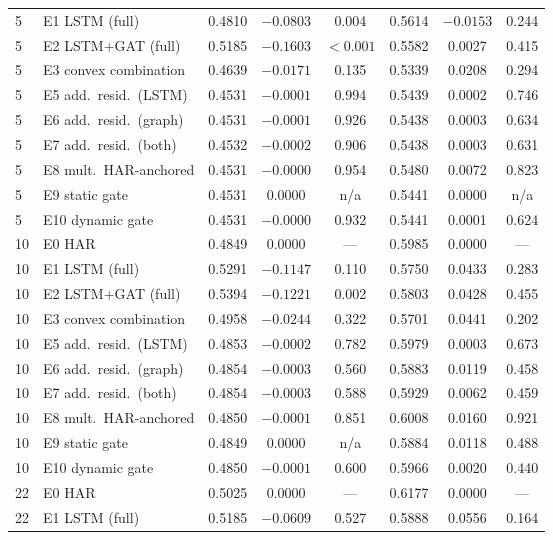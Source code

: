 \documentclass[runningheads]{llncs}
\begin{document}
\begin{table}[t]
\begin{tabular}{ll ccc ccc}
5  & E1 LSTM (full)         & 0.4810 & $-0.0803$ & 0.004 & 0.5614 & $-0.0153$ & 0.244 \\
5  & E2 LSTM+GAT (full)     & 0.5185 & $-0.1603$ & $<0.001$ & 0.5582 & 0.0027  & 0.415 \\
5  & E3 convex combination  & 0.4639 & $-0.0171$ & 0.135 & 0.5339 & 0.0208  & 0.294 \\
5  & E5 add.\ resid.\ (LSTM)   & 0.4531 & $-0.0001$ & 0.994 & 0.5439 & 0.0002  & 0.746 \\
5  & E6 add.\ resid.\ (graph)  & 0.4531 & $-0.0001$ & 0.926 & 0.5438 & 0.0003  & 0.634 \\
5  & E7 add.\ resid.\ (both)   & 0.4532 & $-0.0002$ & 0.906 & 0.5438 & 0.0003  & 0.631 \\
5  & E8 mult.\ HAR-anchored    & 0.4531 & $-0.0000$ & 0.954 & 0.5480 & 0.0072  & 0.823 \\
5  & E9 static gate         & 0.4531 & 0.0000  & n/a & 0.5441 & 0.0000  & n/a \\
5  & E10 dynamic gate       & 0.4531 & $-0.0000$ & 0.932 & 0.5441 & 0.0001  & 0.624 \\
\midrule
10 & E0 HAR                 & 0.4849 & 0.0000  & --- & 0.5985 & 0.0000  & --- \\
10 & E1 LSTM (full)         & 0.5291 & $-0.1147$ & 0.110 & 0.5750 & 0.0433  & 0.283 \\
10 & E2 LSTM+GAT (full)     & 0.5394 & $-0.1221$ & 0.002 & 0.5803 & 0.0428  & 0.455 \\
10 & E3 convex combination  & 0.4958 & $-0.0244$ & 0.322 & 0.5701 & 0.0441  & 0.202 \\
10 & E5 add.\ resid.\ (LSTM)   & 0.4853 & $-0.0002$ & 0.782 & 0.5979 & 0.0003  & 0.673 \\
10 & E6 add.\ resid.\ (graph)  & 0.4854 & $-0.0003$ & 0.560 & 0.5883 & 0.0119  & 0.458 \\
10 & E7 add.\ resid.\ (both)   & 0.4854 & $-0.0003$ & 0.588 & 0.5929 & 0.0062  & 0.459 \\
10 & E8 mult.\ HAR-anchored    & 0.4850 & $-0.0001$ & 0.851 & 0.6008 & 0.0160  & 0.921 \\
10 & E9 static gate         & 0.4849 & 0.0000  & n/a & 0.5884 & 0.0118  & 0.488 \\
10 & E10 dynamic gate       & 0.4850 & $-0.0001$ & 0.600 & 0.5966 & 0.0020  & 0.440 \\
\midrule
22 & E0 HAR                 & 0.5025 & 0.0000  & --- & 0.6177 & 0.0000  & --- \\
22 & E1 LSTM (full)         & 0.5185 & $-0.0609$ & 0.527 & 0.5888 & 0.0556  & 0.164 \\

\end{tabular}
\end{table}
\end{document}
